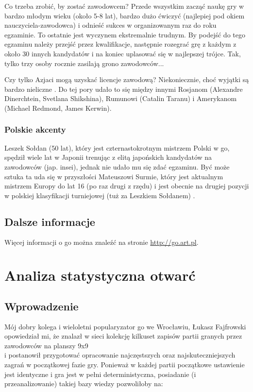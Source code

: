 \documentclass[11pt,leqno]{article}
\begin{document}
Co trzeba zrobić, by zostać zawodowcem? Przede wszystkim zacząć naukę gry w bardzo młodym wieku (około 5-8 lat), 
bardzo dużo ćwiczyć (najlepiej pod okiem nauczyciela-zawodowca) i odnieść sukces w organizowanym raz do roku egzaminie. 
To ostatnie jest wyczynem ekstremalnie trudnym. By podejść do tego egzaminu należy przejść przez kwalifikacje, następnie 
rozegrać grę z każdym z około 30 innych kandydatów i na koniec uplasować się w najlepszej trójce. 
Tak, tylko trzy osoby rocznie zasilają grono zawodowców...

Czy tylko Azjaci mogą uzyskać licencje zawodową? Niekoniecznie, choć wyjątki są bardzo nieliczne \cite{gopros}. Do tej pory udało
to się między innymi Rosjanom (Alexandre Dinerchtein, Svetlana Shikshina), Rumunowi (Catalin Taranu) i Amerykanom 
(Michael Redmond, James Kerwin).

\subsubsection{Polskie akcenty}

Leszek Sołdan (50 lat), który jest czternastokrotnym mistrzem Polski w go, spędził wiele lat w Japonii 
trenując z elitą japońskich kandydatów na zawodowców (jap. insei), jednak nie udało mu się zdać egzaminu. Być może sztuka 
ta uda się w przyszłości Mateuszowi Surmie, który jest aktualnym mistrzem Europy do lat 16 (po raz drugi z rzędu) i jest 
obecnie na drugiej pozycji w polskiej klasyfikacji turniejowej (tuż za Leszkiem Sołdanem) \cite{ranking}.

\subsection{Dalsze informacje}

Więcej informacji o go można znaleźć na stronie \url{http://go.art.pl}.

\section{Analiza statystyczna otwarć}

\subsection{Wprowadzenie}

Mój dobry kolega i wieloletni popularyzator go we Wrocławiu, Łukasz Fajfrowski opowiedział mi, że znalazł w sieci kolekcję 
kilkuset zapisów partii granych przez zawodowców na planszy 9x9 
\\ i postanowił przygotować opracowanie najczęstszych oraz
najskuteczniejszych zagrań w początkowej fazie gry. Ponieważ w każdej partii początkowe ustawienie jest identyczne i gra
jest w pełni deterministyczna, posiadanie (i przeanalizowanie) takiej bazy wiedzy pozwoliłoby na:
\end{document}
